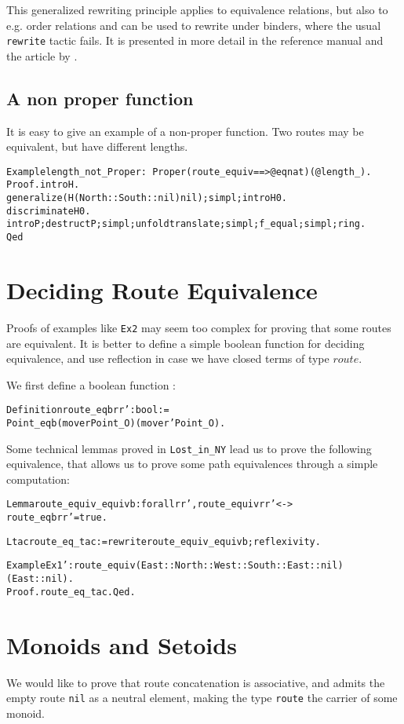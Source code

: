 \documentclass[a4]{report}
\begin{document}
This generalized rewriting principle applies to equivalence relations,
but also to e.g. order relations and can be used to rewrite under
binders, where the usual \texttt{rewrite} tactic fails. It is presented
in more detail in the reference manual and the article by \cite{sozeauJFR09}.


\subsection*{A non proper function}
It is easy to give an example of a non-proper function. Two routes may be
equivalent, but have different lengths.

\begin{alltt}
Example length_not_Proper : ~Proper (route_equiv ==> @eq nat) (@length _).
Proof. intro H.
  generalize (H (North::South::nil) nil);simpl;intro H0.
  discriminate H0.
  intro P;destruct P; simpl;unfold translate; simpl;f_equal;simpl;ring.
Qed
\end{alltt}

\section{Deciding Route Equivalence}
Proofs of examples like \texttt{Ex2} may seem too complex for proving
that some routes are equivalent. It is better to define a simple boolean
function for deciding equivalence, and use reflection in case we have
closed terms of type $route$.

We first define a boolean function :
\begin{alltt}
Definition route_eqb r r' : bool :=
   Point_eqb (move r Point_O) (move r' Point_O).
\end{alltt}

Some technical lemmas proved in \texttt{Lost\_in\_NY} lead us to prove 
the following equivalence, that allows us to prove some path equivalences
through a simple computation:

\begin{alltt}
Lemma route_equiv_equivb : forall r r', route_equiv r r' <->
                                        route_eqb r r' = true.

Ltac route_eq_tac := rewrite route_equiv_equivb;reflexivity.

Example Ex1' : route_equiv (East::North::West::South::East::nil) (East::nil).
Proof. route_eq_tac. Qed.
\end{alltt}

\section{Monoids and Setoids}
We would like to prove that route concatenation is associative, and admits
the empty route \texttt{nil} as a neutral element, making the type 
\texttt{route} the carrier of some monoid.
 
\end{document}
